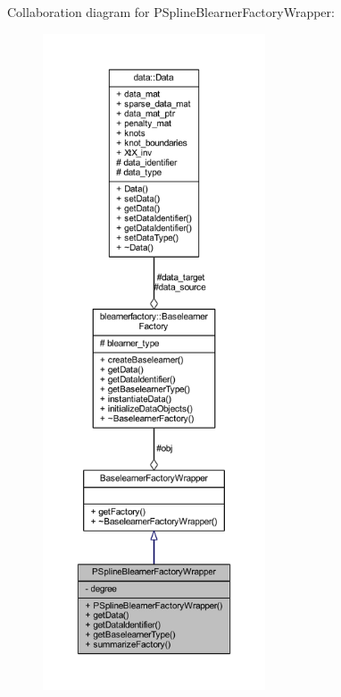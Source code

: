 Collaboration diagram for P\+Spline\+Blearner\+Factory\+Wrapper\+:\nopagebreak
\begin{figure}[H]
\begin{center}
\leavevmode
\includegraphics[height=550pt]{class_p_spline_blearner_factory_wrapper__coll__graph}
\end{center}
\end{figure}
